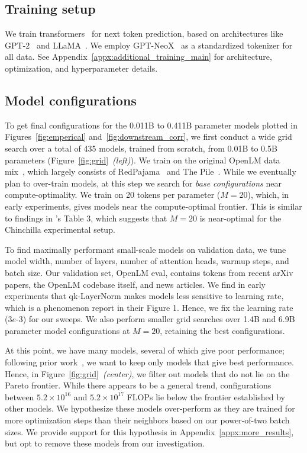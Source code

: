 \documentclass[dvipsnames,11pt]{article}
\begin{document}
\subsection{Training setup}
\label{sec:training}

We train transformers~\cite{transformer} for next token prediction, based on architectures like GPT-2~\cite{Radford2019LanguageMA} and LLaMA~\cite{llama}.
We employ GPT-NeoX~\cite{neox} as a standardized tokenizer for all data.
See Appendix~\ref{appx:additional_training_main} for architecture, optimization, and hyperparameter details.

\subsection{Model configurations}
\label{sec:searching}

To get final configurations for the 0.011B to 0.411B parameter models plotted in Figures~\ref{fig:emperical} and~\ref{fig:downstream_corr}, we first conduct a wide grid search over a total of 435 models, trained from scratch, from 0.01B to 0.5B parameters (Figure~\ref{fig:grid}~\emph{(left)}).
We train on the original OpenLM data mix~\cite{open_lm}, which largely consists of RedPajama~\cite{rpj} and The Pile~\cite{pile}.
While we eventually plan to over-train models, at this step we search for \emph{base configurations} near compute-optimality.
We train on 20 tokens per parameter ($M=20$), which, in early experiments, gives models near the compute-optimal frontier.
This is similar to findings in \citet{chinchilla}'s Table 3, which suggests that $M=20$ is near-optimal for the Chinchilla experimental setup.

To find maximally performant small-scale models on validation data, we tune model width, number of layers, number of attention heads, warmup steps, and batch size.
Our validation set, OpenLM eval, contains tokens from recent arXiv papers, the OpenLM codebase itself, and news articles.
We find in early experiments that qk-LayerNorm makes models less sensitive to learning rate, which is a phenomenon \citet{wortsman2023small} report in their Figure 1.
Hence, we fix the learning rate (3$e$-3) for our sweeps.
We also perform smaller grid searches over 1.4B and 6.9B parameter model configurations at $M=20$, retaining the best configurations.

At this point, we have many models, several of which give poor performance; following prior work~\cite{kaplan2020scaling,chinchilla}, we want to keep only models that give best performance.
Hence, in Figure~\ref{fig:grid}~\emph{(center)}, we filter out models that do not lie on the Pareto frontier.
While there appears to be a general trend, configurations between $5.2 \times 10^{16}$ and $5.2 \times 10^{17}$ FLOPs lie below the frontier established by other models.
We hypothesize these models over-perform as they are trained for more optimization steps than their neighbors based on our power-of-two batch sizes.
We provide support for this hypothesis in Appendix~\ref{appx:more_results}, but opt to remove these models from our investigation.
\end{document}
